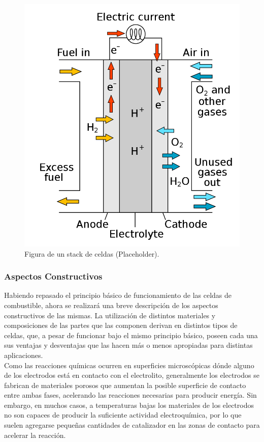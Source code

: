 \begin{figure}[h]
    \centering
    \includegraphics[scale=0.2]{Imagenes/Fuel Cell.png}
    \caption{Figura de un stack de celdas (Placeholder).}
    \label{fuel_cell_stack}
\end{figure}

\subsubsection{Aspectos Constructivos}

Habiendo repasado el principio básico de funcionamiento de las celdas de combustible, ahora se realizará una breve descripción de los aspectos constructivos de las mismas. La utilización de distintos materiales y composiciones de las partes que las componen derivan en distintos tipos de celdas, que, a pesar de funcionar bajo el mismo principio básico, poseen cada una sus ventajas y desventajas que las hacen más o menos apropiadas para distintas aplicaciones.\\

Como las reacciones químicas ocurren en superficies microscópicas dónde alguno de los electrodos está en contacto con el electrolito, generalmente los electrodos se fabrican de materiales porosos que aumentan la posible superficie de contacto entre ambas fases, acelerando las reacciones necesarias para producir energía. Sin embargo, en muchos casos, a temperaturas bajas los materiales de los electrodos no son capaces de producir la suficiente actividad electroquímica, por lo que suelen agregarse pequeñas cantidades de catalizador en las zonas de contacto para acelerar la reacción.\\

